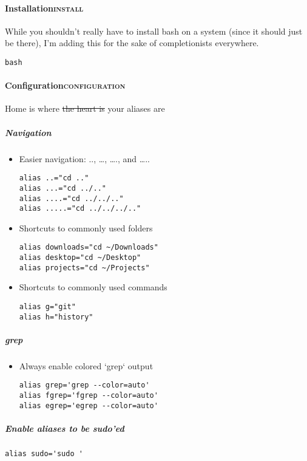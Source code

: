 \documentclass[11pt]{article}
\begin{document}
\paragraph{Installation\hfill{}\textsc{install}}
\label{sec:org443e12c}
While you shouldn't really have to install bash on a system (since it should just be there), I'm adding this for the sake of completionists everywhere.
\begin{verbatim}
bash
\end{verbatim}

\paragraph{Configuration\hfill{}\textsc{configuration}}
\label{sec:orga27a95a}

Home is where \sout{the heart is} your aliases are

\subparagraph{Navigation}
\label{sec:org912745c}
\begin{itemize}
\item Easier navigation: .., \ldots{}, \ldots{}., and \ldots{}..
\label{sec:orgc551e20}
\begin{verbatim}
alias ..="cd .."
alias ...="cd ../.."
alias ....="cd ../../.."
alias .....="cd ../../../.."
\end{verbatim}
\item Shortcuts to commonly used folders
\label{sec:org2dc83dc}
\begin{verbatim}
alias downloads="cd ~/Downloads"
alias desktop="cd ~/Desktop"
alias projects="cd ~/Projects"
\end{verbatim}
\item Shortcuts to commonly used commands
\label{sec:org15f4f6f}
\begin{verbatim}
alias g="git"
alias h="history"
\end{verbatim}
\end{itemize}

\subparagraph{grep}
\label{sec:orgebc4cce}
\begin{itemize}
\item Always enable colored `grep` output
\label{sec:org5d60556}
\begin{verbatim}
alias grep='grep --color=auto'
alias fgrep='fgrep --color=auto'
alias egrep='egrep --color=auto'
\end{verbatim}
\end{itemize}

\subparagraph{Enable aliases to be sudo’ed}
\label{sec:orgf3b9d91}
\begin{verbatim}
alias sudo='sudo '
\end{verbatim}
\end{document}
